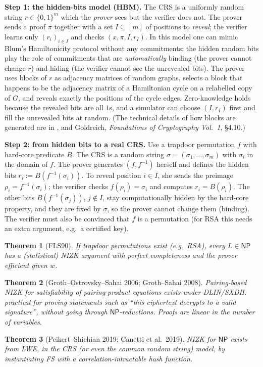 \documentclass[11pt,a4paper]{report}
\theoremstyle{plain}
\newtheorem{theorem}{Theorem}[chapter]
\theoremstyle{definition}
\theoremstyle{remark}
\newcommand{\NP}{\mathsf{NP}}\newcommand{\BPP}{\mathsf{BPP}}\newcommand{\IP}{\mathsf{IP}}
\begin{document}
\textbf{Step 1: the hidden-bits model (HBM).} The CRS is a uniformly random string $r\in\{0,1\}^m$ which the \emph{prover} sees but the verifier does not. The prover sends a proof $\pi$ together with a set $I\subseteq[m]$ of positions to \emph{reveal}; the verifier learns only $(r_i)_{i\in I}$ and checks $(x,\pi,I,r_I)$. In this model one can mimic Blum's Hamiltonicity protocol without any commitments: the hidden random bits play the role of commitments that are \emph{automatically} binding (the prover cannot change $r$) and hiding (the verifier cannot see the unrevealed bits). The prover uses blocks of $r$ as adjacency matrices of random graphs, selects a block that happens to be the adjacency matrix of a Hamiltonian cycle on a relabelled copy of $G$, and reveals exactly the positions of the cycle edges. Zero-knowledge holds because the revealed bits are all $1$s, and a simulator can choose $(I,r_I)$ first and fill the unrevealed bits at random. (The technical details of how blocks are generated are in \cite{FLS99}, and Goldreich, \emph{Foundations of Cryptography Vol.\ 1}, \S4.10.)

\textbf{Step 2: from hidden bits to a real CRS.} Use a trapdoor permutation $f$ with hard-core predicate $B$. The CRS is a random string $\sigma=(\sigma_1,\dots,\sigma_m)$ with $\sigma_i$ in the domain of $f$. The prover generates $(f,f^{-1})$ herself and defines the hidden bits $r_i:=B(f^{-1}(\sigma_i))$. To reveal position $i\in I$, she sends the preimage $\rho_i=f^{-1}(\sigma_i)$; the verifier checks $f(\rho_i)=\sigma_i$ and computes $r_i=B(\rho_i)$. The other bits $B(f^{-1}(\sigma_j))$, $j\notin I$, stay computationally hidden by the hard-core property, and they are fixed by $\sigma$, so the prover cannot change them (binding). The verifier must also be convinced that $f$ is a permutation (for RSA this needs an extra argument, e.g.\ a certified key).
\begin{theorem}[FLS90]
If trapdoor permutations exist (e.g.\ RSA), every $L\in\NP$ has a (statistical) NIZK argument with perfect completeness and the prover efficient given $w$.
\end{theorem}
\begin{theorem}[Groth--Ostrovsky--Sahai 2006; Groth--Sahai 2008]
Pairing-based NIZK for satisfiability of pairing-product equations exists under DLIN/SXDH: practical for proving statements such as ``this ciphertext decrypts to a valid signature'', without going through $\NP$-reductions. Proofs are linear in the number of variables.
\end{theorem}
\begin{theorem}[Peikert--Shiehian 2019; Canetti et al.\ 2019]
NIZK for $\NP$ exists from LWE, in the CRS (or even the common random string) model, by instantiating FS with a correlation-intractable hash function.
\end{theorem}
\end{document}
